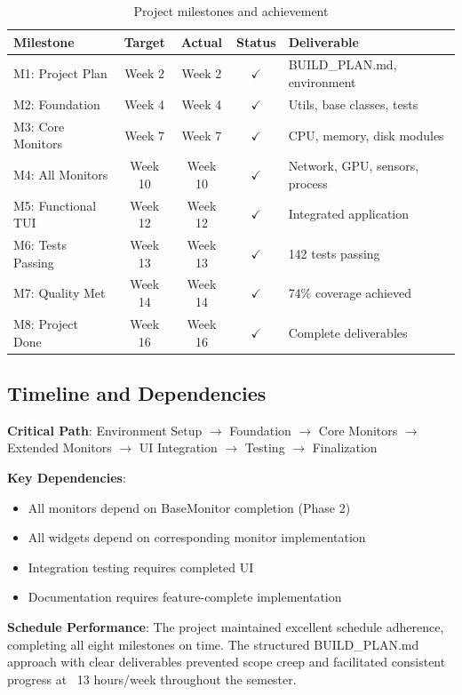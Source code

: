 \documentclass[12pt,a4paper,oneside]{report}
\begin{document}
\begin{table}[h]
\centering
\caption{Project milestones and achievement}
\label{tab:milestones}
\small
\begin{tabular}{|l|c|c|c|l|}
\hline
\textbf{Milestone} & \textbf{Target} & \textbf{Actual} & \textbf{Status} & \textbf{Deliverable} \\
\hline
M1: Project Plan & Week 2 & Week 2 & $\checkmark$ & BUILD\_PLAN.md, environment \\
M2: Foundation & Week 4 & Week 4 & $\checkmark$ & Utils, base classes, tests \\
M3: Core Monitors & Week 7 & Week 7 & $\checkmark$ & CPU, memory, disk modules \\
M4: All Monitors & Week 10 & Week 10 & $\checkmark$ & Network, GPU, sensors, process \\
M5: Functional TUI & Week 12 & Week 12 & $\checkmark$ & Integrated application \\
M6: Tests Passing & Week 13 & Week 13 & $\checkmark$ & 142 tests passing \\
M7: Quality Met & Week 14 & Week 14 & $\checkmark$ & 74\% coverage achieved \\
M8: Project Done & Week 16 & Week 16 & $\checkmark$ & Complete deliverables \\
\hline
\end{tabular}
\end{table}

\subsection{Timeline and Dependencies}

\textbf{Critical Path}: Environment Setup $\rightarrow$ Foundation $\rightarrow$ Core Monitors $\rightarrow$ Extended Monitors $\rightarrow$ UI Integration $\rightarrow$ Testing $\rightarrow$ Finalization

\textbf{Key Dependencies}:
\begin{itemize}
    \item All monitors depend on BaseMonitor completion (Phase 2)
    \item All widgets depend on corresponding monitor implementation
    \item Integration testing requires completed UI
    \item Documentation requires feature-complete implementation
\end{itemize}

\textbf{Schedule Performance}: The project maintained excellent schedule adherence, completing all eight milestones on time. The structured BUILD\_PLAN.md approach with clear deliverables prevented scope creep and facilitated consistent progress at ~13 hours/week throughout the semester.
\end{document}
